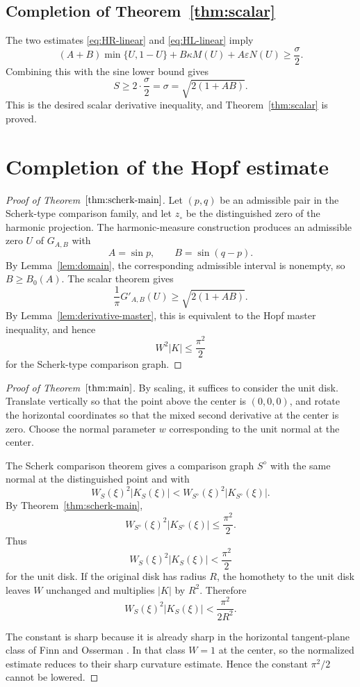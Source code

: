 \documentclass[11pt]{amsart}
\theoremstyle{remark}
\newcommand{\eps}{\varepsilon}
\newcommand{\zc}{z_\circ}
\numberwithin{equation}{section}
\begin{document}
\subsection{Completion of Theorem~\ref{thm:scalar}}

The two estimates \eqref{eq:HR-linear} and \eqref{eq:HL-linear} imply
\[
        (A+B)\min\{U,1-U\}+B\kappa M(U)+A\eps N(U)
        \geq \frac\sigma2.
\]
Combining this with the sine lower bound gives
\[
        S\geq 2\cdot \frac\sigma2=\sigma=
        \sqrt{2(1+AB)}.
\]
This is the desired scalar derivative inequality, and Theorem~\ref{thm:scalar} is proved.

\section{Completion of the Hopf estimate}\label{sec:completion}

\begin{proof}[Proof of Theorem~$\ref{thm:scherk-main}$]
Let $(p,q)$ be an admissible pair in the Scherk-type comparison family, and let $\zc$ be the distinguished zero of the harmonic projection. The harmonic-measure construction produces an admissible zero $U$ of $G_{A,B}$ with
\[
        A=\sin p,
        \qquad
        B=\sin(q-p).
\]
By Lemma~\ref{lem:domain}, the corresponding admissible interval is nonempty, so $B\geq B_0(A)$. The scalar theorem gives
\[
        \frac1\pi G'_{A,B}(U)\geq \sqrt{2(1+AB)}.
\]
By Lemma~\ref{lem:derivative-master}, this is equivalent to the Hopf master inequality, and hence 
\[
        W^2|K|\leq \frac{\pi^2}{2}
\]
for the Scherk-type comparison graph.
\end{proof}

\begin{proof}[Proof of Theorem~$\ref{thm:main}$]
By scaling, it suffices to consider the unit disk. Translate vertically so that the point above the center is $(0,0,0)$, and rotate the horizontal coordinates so that the mixed second derivative at the center is zero. Choose the normal parameter $w$ corresponding to the unit normal at the center.

The Scherk comparison theorem gives a comparison graph $S^\diamond$ with the same normal at the distinguished point and with
\[
        W_S(\xi)^2 |K_S(\xi)|
        <
        W_{S^\diamond}(\xi)^2 |K_{S^\diamond}(\xi)|.
\]
By Theorem~\ref{thm:scherk-main},
\[
        W_{S^\diamond}(\xi)^2 |K_{S^\diamond}(\xi)|
        \leq \frac{\pi^2}{2}.
\]
Thus
\[
        W_S(\xi)^2 |K_S(\xi)|
        <\frac{\pi^2}{2}
\]
for the unit disk. If the original disk has radius $R$, the homothety to the unit disk leaves $W$ unchanged and multiplies $|K|$ by $R^2$. Therefore
\[
        W_S(\xi)^2 |K_S(\xi)|
        < \frac{\pi^2}{2R^2}.
\]

The constant is sharp because it is already sharp in the horizontal tangent-plane class of Finn and Osserman \cite{FinnOsserman1964}.  In that class $W=1$ at the center, so the normalized estimate reduces to their sharp curvature estimate.  Hence the constant $\pi^2/2$ cannot be lowered.
\end{proof}
\end{document}
